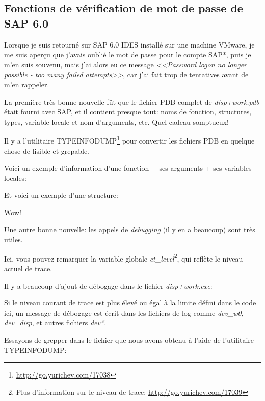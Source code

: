 \subsection{Fonctions de vérification de mot de passe de SAP 6.0}


Lorsque je suis retourné sur SAP 6.0 IDES installé sur une machine VMware, je me
suis aperçu que j'avais oublié le mot de passe pour le compte SAP*, puis je m'en 
suis souvenu, mais j'ai alors eu ce message
\emph{<<Password logon no longer possible - too many failed attempts>>},
car j'ai fait trop de tentatives avant de m'en rappeler.


La première très bonne nouvelle fût que le fichier \gls{PDB} complet de \emph{disp+work.pdb}
était fourni avec SAP, et il contient presque tout: noms de fonction, structures,
types, variable locale et nom d'arguments, etc. Quel cadeau somptueux!

Il y a l'utilitaire TYPEINFODUMP\footnote{\url{http://go.yurichev.com/17038}} pour
convertir les fichiers \gls{PDB} en quelque chose de lisible et grepable.

Voici un exemple d'information d'une fonction + ses arguments + ses variables locales:



Et voici un exemple d'une structure:



Wow!

Une autre bonne nouvelle: les appels de \emph{debugging} (il y en a beaucoup) sont
très utiles.

Ici, vous pouvez remarquer la variable globale \emph{ct\_level}\footnote{Plus d'information
sur le niveau de trace: \url{http://go.yurichev.com/17039}}, qui reflète le niveau
actuel de trace.

Il y a beaucoup d'ajout de débogage dans le fichier \emph{disp+work.exe}:



Si le niveau courant de trace est plus élevé ou égal à la limite défini dans le code
ici, un message de débogage est écrit dans les fichiers de log comme \emph{dev\_w0},
\emph{dev\_disp}, et autres fichiers \emph{dev*}.

\myindex{\GrepUsage}

Essayons de grepper dans le fichier que nous avons obtenu à l'aide de l'utilitaire
TYPEINFODUMP:

